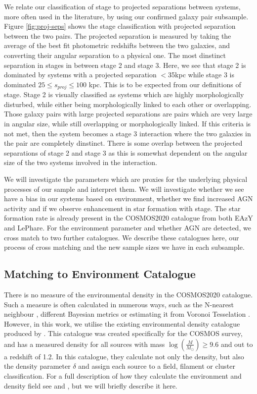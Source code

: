 \documentclass[fleqn,usenatbib]{mnras}
\begin{document}
We relate our classification of stage to projected separations between systems, more often used in the literature, by using our confirmed galaxy pair subsample. Figure \ref{fig:proj-seps} shows the stage classification with projected separation between the two pairs. The projected separation is measured by taking the average of the best fit photometric redshifts between the two galaxies, and converting their angular separation to a physical one. The most dinstinct separation in stages in between stage 2 and stage 3. Here, we see that stage 2 is dominated by systems with a projected separation $<$35kpc while stage 3 is dominated $25 \leq s_{proj} \leq 100$ kpc. This is to be expected from our definitions of stage. Stage 2 is visually classified as systems which are highly morphologically disturbed, while either being morphologically linked to each other or overlapping. Those galaxy pairs with large projected separations are pairs which are very large in angular size, while still overlapping or morphologically linked. If this criteria is not met, then the system becomes a stage 3 interaction where the two galaxies in the pair are completely dinstinct. There is some overlap between the projected separations of stage 2 and stage 3 as this is somewhat dependent on the angular size of the two systems involved in the interaction. 

We will investigate the parameters which are proxies for the underlying physical processes of our sample and interpret them. We will investigate whether we see have a bias in our systems based on environment, whether we find increased AGN activity and if we observe enhancement in star formation with stage. The star formation rate is already present in the COSMOS2020 catalogue from both EAzY and LePhare. For the environment parameter and whether AGN are detected, we cross match to two further catalogues. We describe these catalogues here, our process of cross matching and the new sample sizes we have in each subsample.

\subsection{Matching to Environment Catalogue}\label{data:environ}
\noindent There is no measure of the environmental density in the COSMOS2020 catalogue. Such a measure is often calculated in numerous ways, such as the N-nearest neighbour \citep{2006MNRAS.373..469B}, different Bayesian metrics \citep{2008ApJ...674L..13C} or estimating it from Voronoi Tesselation \citep{2021inas.book...57V}. However, in this work, we utilise the existing environmental density catalogue produced by \citet{2017ApJ...837...16D}. This catalogue was created specifically for the COSMOS survey, and has a measured density for all sources with mass $\log(\frac{M}{M_\odot}) \geq 9.6$ and out to a redshift of 1.2. In this catalogue, they calculate not only the density, but also the density parameter $\delta$ and assign each source to a field, filament or cluster classification. For a full description of how they calculate the environment and density field see \citet{2015ApJ...805..121D} and \citet{2017ApJ...837...16D}, but we will briefly describe it here.
\end{document}
